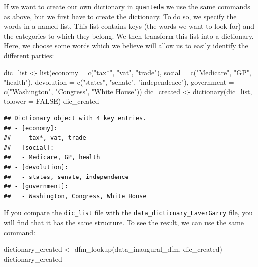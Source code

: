 \documentclass[
]{book}
\newenvironment{Shaded}{\begin{snugshade}}{\end{snugshade}}
\newcommand{\AttributeTok}[1]{\textcolor[rgb]{0.77,0.63,0.00}{#1}}
\newcommand{\ConstantTok}[1]{\textcolor[rgb]{0.00,0.00,0.00}{#1}}
\newcommand{\FunctionTok}[1]{\textcolor[rgb]{0.00,0.00,0.00}{#1}}
\newcommand{\NormalTok}[1]{#1}
\newcommand{\OtherTok}[1]{\textcolor[rgb]{0.56,0.35,0.01}{#1}}
\newcommand{\StringTok}[1]{\textcolor[rgb]{0.31,0.60,0.02}{#1}}
\begin{document}
If we want to create our own dictionary in \texttt{quanteda} we use the same commands as above, but we first have to create the dictionary. To do so, we specify the words in a named list. This list contains keys (the words we want to look for) and the categories to which they belong. We then transform this list into a dictionary. Here, we choose some words which we believe will allow us to easily identify the different parties:

\begin{Shaded}
\begin{Highlighting}[]
\NormalTok{dic\_list }\OtherTok{\textless{}{-}} \FunctionTok{list}\NormalTok{(}\AttributeTok{economy =} \FunctionTok{c}\NormalTok{(}\StringTok{"tax*"}\NormalTok{, }\StringTok{"vat"}\NormalTok{, }\StringTok{"trade"}\NormalTok{), }\AttributeTok{social =} \FunctionTok{c}\NormalTok{(}\StringTok{"Medicare"}\NormalTok{,}
    \StringTok{"GP"}\NormalTok{, }\StringTok{"health"}\NormalTok{), }\AttributeTok{devolution =} \FunctionTok{c}\NormalTok{(}\StringTok{"states"}\NormalTok{, }\StringTok{"senate"}\NormalTok{, }\StringTok{"independence"}\NormalTok{),}
    \AttributeTok{government =} \FunctionTok{c}\NormalTok{(}\StringTok{"Washington"}\NormalTok{, }\StringTok{"Congress"}\NormalTok{, }\StringTok{"White House"}\NormalTok{))}
\NormalTok{dic\_created }\OtherTok{\textless{}{-}} \FunctionTok{dictionary}\NormalTok{(dic\_list, }\AttributeTok{tolower =} \ConstantTok{FALSE}\NormalTok{)}
\NormalTok{dic\_created}
\end{Highlighting}
\end{Shaded}

\begin{verbatim}
## Dictionary object with 4 key entries.
## - [economy]:
##   - tax*, vat, trade
## - [social]:
##   - Medicare, GP, health
## - [devolution]:
##   - states, senate, independence
## - [government]:
##   - Washington, Congress, White House
\end{verbatim}

If you compare the \texttt{dic\_list} file with the \texttt{data\_dictionary\_LaverGarry} file, you will find that it has the same structure. To see the result, we can use the same command:

\begin{Shaded}
\begin{Highlighting}[]
\NormalTok{dictionary\_created }\OtherTok{\textless{}{-}} \FunctionTok{dfm\_lookup}\NormalTok{(data\_inaugural\_dfm, dic\_created)}
\NormalTok{dictionary\_created}
\end{Highlighting}
\end{Shaded}
\end{document}
